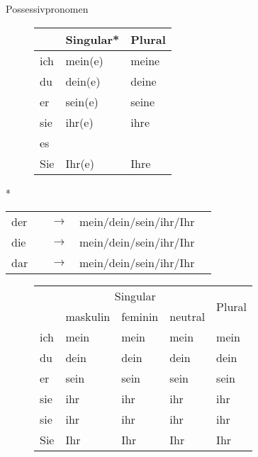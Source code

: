 \begin{syntax}{Possessivpronomen}{}
\begin{figure}[H]
\begin{tabular}{|l|l|l|}
	\hline
	& Singular* & Plural \\
	\hline
	ich & mein(e) & meine \\
	du & dein(e) & deine \\
	\hline
	er & sein(e) & seine \\
	sie & ihr(e) & ihre \\
	es & & \\
	\hline
	Sie & Ihr(e) & Ihre \\
	\hline
\end{tabular}
\end{figure}

*
\begin{tabular}{lllll}
	der & \ssthere & $\rightarrow$ & mein/dein/sein/ihr/Ihr & \ssthere \\
	die & \ssthere & $\rightarrow$ & mein\att{e}/dein\att{e}/sein\att{e}/ihr\att{e}/Ihr\att{e} & \ssthere \\
	dar & \ssthere & $\rightarrow$ & mein/dein/sein/ihr/Ihr & \ssthere
\end{tabular}

\begin{figure}[H]
\begin{tabular}{|l|l|l|l|l|}
	\hline
	& \multicolumn{3}{c|}{Singular} & \multirow{2}{*}{Plural} \\
	\cline{2-4}
	& maskulin & feminin & neutral & \\
	\hline
	ich & mein & mein\att{e} & mein & mein\att{e} \\
	\hline
	du & dein & dein\att{e} & dein & dein\att{e} \\
	\hline
	er & sein & sein\att{e} & sein & sein\att{e} \\
	sie & ihr & ihr\att{e} & ihr & ihr\att{e} \\
	\hline
	sie & ihr & ihr\att{e} & ihr & ihr\att{e} \\
	\hline
	Sie & Ihr & Ihr\att{e} & Ihr & Ihr\att{e} \\
	\hline
\end{tabular}
\end{figure}
\end{syntax}

